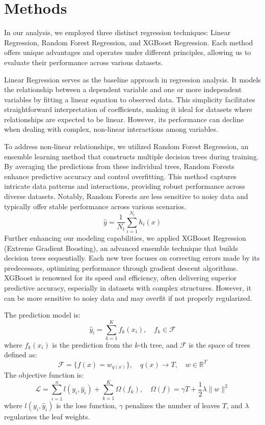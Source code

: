 \section{Methods}

In our analysis, we employed three distinct regression techniques: Linear Regression,
Random Forest Regression, and XGBoost Regression. Each method offers unique
advantages and operates under different principles, allowing us to evaluate their
performance across various datasets.

Linear Regression serves as the baseline approach in regression analysis. It
models the relationship between a dependent variable and one or more independent
variables by fitting a linear equation to observed data. This simplicity facilitates
straightforward interpretation of coefficients, making it ideal for datasets
where relationships are expected to be linear. However, its performance can
decline when dealing with complex, non-linear interactions among variables.

To address non-linear relationships, we utilized Random Forest Regression, an ensemble
learning method that constructs multiple decision trees during training. By
averaging the predictions from these individual trees, Random Forests enhance predictive
accuracy and control overfitting. This method captures intricate data patterns
and interactions, providing robust performance across diverse datasets. Notably,
Random Forests are less sensitive to noisy data and typically offer stable performance
across various scenarios.
\[
	\hat{y}= \frac{1}{N_{t}}\sum_{i=1}^{N_t}h_{i}(x)
\]
Further enhancing our modeling capabilities, we applied XGBoost Regression (Extreme
Gradient Boosting), an advanced ensemble technique that builds decision trees
sequentially. Each new tree focuses on correcting errors made by its predecessors,
optimizing performance through gradient descent algorithms. XGBoost is renowned for
its speed and efficiency, often delivering superior predictive accuracy, especially
in datasets with complex structures. However, it can be more sensitive to noisy data
and may overfit if not properly regularized.

The prediction model is:
\[
	\hat{y}_{i}= \sum_{k=1}^{K}f_{k}(x_{i}), \quad f_{k}\in \mathcal{F}
\]
where $f_{k}(x_{i})$ is the prediction from the $k$-th tree, and $\mathcal{F}$ is
the space of trees defined as:
\[
	\mathcal{F}= \{f(x) = w_{q(x)}\}, \quad q(x) \to T, \quad w \in \mathbb{R}^{T}
\]
The objective function is:
\[
	\mathcal{L}= \sum_{i=1}^{n}l(y_{i}, \hat{y}_{i}) + \sum_{k=1}^{K}\Omega(f_{k}),
	\quad \Omega(f) = \gamma T + \frac{1}{2}\lambda \|w\|^{2}
\]
where $l(y_{i}, \hat{y}_{i})$ is the loss function, $\gamma$ penalizes the
number of leaves $T$, and $\lambda$ regularizes the leaf weights.


